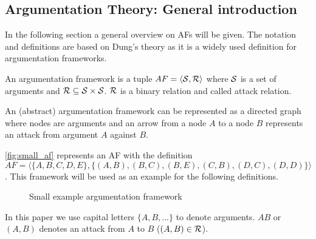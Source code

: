 \subsection{Argumentation Theory: General introduction}
\label{sub:dung}
In the following section a general overview on \glspl{AF} will be given. The notation and definitions are based on Dung's theory \cite{dung1995} as it is a widely used definition for argumentation frameworks.
\begin{definition}
	An argumentation framework is a tuple $AF = \langle \S, \R \rangle$ where $\S$ is a set of arguments and $ \R \subseteq \S \times \S$. $\R$ is a binary relation and called attack relation.
\end{definition}


An (abstract) argumentation framework can be represented as a directed graph where nodes are arguments and an arrow from a node $A$ to a node $B$ represents an attack from argument $A$ against $B$.

\begin{exa}
 \autoref{fig:small_af} represents an \gls{AF} with the definition $AF = \langle \{A, B, C, D, E\}, \allowbreak \{(A,B), (B, C),\allowbreak (B, E), (C, B),\allowbreak (D,C), (D,D)\} \rangle $. This framework will be used as an example for the following definitions.
\end{exa}


\begin{figure}[h]
\centering
{}
\caption{Small example argumentation framework}
\label{fig:small_af}
\end{figure}


\begin{notation}
In this paper we use capital letters $\{A, B, ...\}$ to denote arguments. $AB$ or $(A, B)$ denotes an attack from $A$ to $B$ ($(A,B) \in \R$).	
\end{notation}

